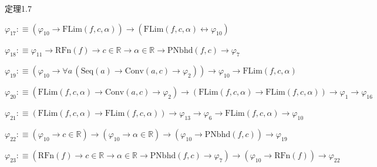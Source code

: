 \begin{fullproof}{定理1.7}
\begin{abbrevlist}
\item $\varphi_{17} :\equiv (\varphi_{10} \to \mathrm{FLim}(f,c,\alpha)) \to (\mathrm{FLim}(f,c,\alpha) \leftrightarrow \varphi_{10})$
\item $\varphi_{18} :\equiv \varphi_{11} \to \mathrm{RFn}(f) \to c \in \mathbb{R} \to \alpha \in \mathbb{R} \to \mathrm{PNbhd}(f,c) \to \varphi_{7}$
\item $\varphi_{19} :\equiv (\varphi_{10} \to \forall a\,(\mathrm{Seq}(a) \to \mathrm{Conv}(a,c) \to \varphi_{2})) \to \varphi_{10} \to \mathrm{FLim}(f,c,\alpha)$
\item $\varphi_{20} :\equiv (\mathrm{FLim}(f,c,\alpha) \to \mathrm{Conv}(a,c) \to \varphi_{2}) \to (\mathrm{FLim}(f,c,\alpha) \to \mathrm{FLim}(f,c,\alpha)) \to \varphi_{1} \to \varphi_{16}$
\item $\varphi_{21} :\equiv (\mathrm{FLim}(f,c,\alpha) \to \mathrm{FLim}(f,c,\alpha)) \to \varphi_{13} \to \varphi_{6} \to \mathrm{FLim}(f,c,\alpha) \to \varphi_{10}$
\item $\varphi_{22} :\equiv (\varphi_{10} \to c \in \mathbb{R}) \to (\varphi_{10} \to \alpha \in \mathbb{R}) \to (\varphi_{10} \to \mathrm{PNbhd}(f,c)) \to \varphi_{19}$
\item $\varphi_{23} :\equiv (\mathrm{RFn}(f) \to c \in \mathbb{R} \to \alpha \in \mathbb{R} \to \mathrm{PNbhd}(f,c) \to \varphi_{7}) \to (\varphi_{10} \to \mathrm{RFn}(f)) \to \varphi_{22}$
\end{abbrevlist}
\end{fullproof}
